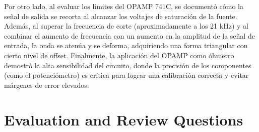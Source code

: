 \documentclass[11pt]{article}
\begin{document}
Por otro lado, al evaluar los límites del OPAMP 741C, se documentó cómo la señal de salida se recorta al alcanzar los voltajes de saturación de la fuente. Además, al superar la frecuencia de corte (aproximadamente a los 21 kHz) y al combinar el aumento de frecuencia con un aumento en la amplitud de la señal de entrada, la onda se atenúa y se deforma, adquiriendo una forma triangular con cierto nivel de offset. Finalmente, la aplicación del OPAMP como óhmetro demostró la alta sensibilidad del circuito, donde la precisión de los componentes (como el potenciómetro) es crítica para lograr una calibración correcta y evitar márgenes de error elevados.

\vspace{9cm}

\newpage
\section*{Evaluation and Review Questions}
\end{document}
